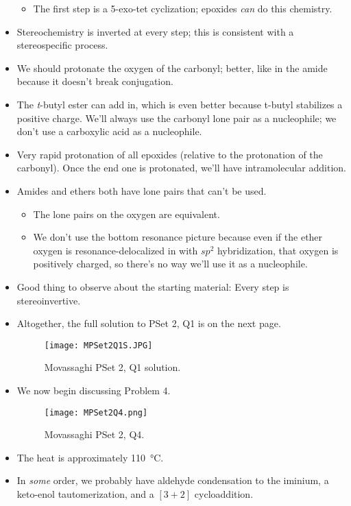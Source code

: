 \documentclass[../notes.tex]{subfiles}
\begin{document}
\begin{itemize}
\begin{itemize}
        \item The first step is a 5-exo-tet cyclization; epoxides \emph{can} do this chemistry.
    \end{itemize}
    \item Stereochemistry is inverted at every step; this is consistent with a stereospecific process.
    \item We should protonate the oxygen of the carbonyl; better, like in the amide because it doesn't break conjugation.
    \item The \emph{t}-butyl ester can add in, which is even better because t-butyl stabilizes a positive charge. We'll always use the carbonyl lone pair as a nucleophile; we don't use a carboxylic acid as a nucleophile.
    \item Very rapid protonation of all epoxides (relative to the protonation of the carbonyl). Once the end one is protonated, we'll have intramolecular addition.
    \item Amides and ethers both have lone pairs that can't be used.
    \begin{itemize}
        \item The lone pairs on the oxygen are equivalent.
        \item We don't use the bottom resonance picture because even if the ether oxygen is resonance-delocalized in with $sp^2$ hybridization, that oxygen is positively charged, so there's no way we'll use it as a nucleophile.
    \end{itemize}
    \item Good thing to observe about the starting material: Every step is stereoinvertive.
    \item Altogether, the full solution to PSet 2, Q1 is on the next page.
    \begin{figure}[h!]
        \centering
        \texttt{[image: MPSet2Q1S.JPG]}
        \caption{Movassaghi PSet 2, Q1 solution.}
        \label{fig:MPSet2Q1S}
    \end{figure}
    \pagebreak
    \item We now begin discussing Problem 4.
    \begin{figure}[h!]
        \centering
        \texttt{[image: MPSet2Q4.png]}
        \caption{Movassaghi PSet 2, Q4.}
        \label{fig:MPSet2Q4}
    \end{figure}
    \item The heat is approximately \SI{110}{\celsius}.
    \item In \emph{some} order, we probably have aldehyde condensation to the iminium, a keto-enol tautomerization, and a $[3+2]$ cycloaddition.

\end{itemize}
\end{document}
